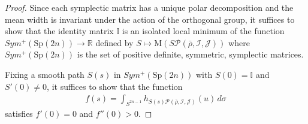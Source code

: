 \documentclass[12pt]{amsart}
\theoremstyle{definition}
\newcommand{\II}{{\mathbb I}}
\newcommand{\RR}{{\mathbb R}}
\newcommand{\mw}{{{\mathrm {M}}}}
\begin{document}




\begin{proof} Since each symplectic matrix has a unique polar decomposition and the mean width is invariant under the action of the orthogonal group, it suffices to show that the identity matrix $\II$ is an isolated local minimum of the function $ Sym^+(\mathrm{Sp}(2n)) \to \RR$ defined by $S \mapsto\mw(S \mathcal{P}(\bar{\rho},\mathcal{I},\mathcal{J}))$ where $Sym^+(\mathrm{Sp}(2n))$ is the set of positive definite, symmetric, symplectic matrices.

Fixing a smooth path $S(s)$ in $Sym^+(\mathrm{Sp}(2n))$ with $S(0)=\II$ and $S'(0) \neq 0$, it suffices to show that the function
    \begin{align}\label{eq:calc}
        f(s) = \int_{S^{2n-1}} h_{S(s)\mathcal{P}(\bar{\rho},\mathcal{I},\mathcal{J})}(u) \, d\sigma
    \end{align}
    satisfies $f'(0) =0$ and $f''(0) >0.$


\end{proof}
\end{document}
